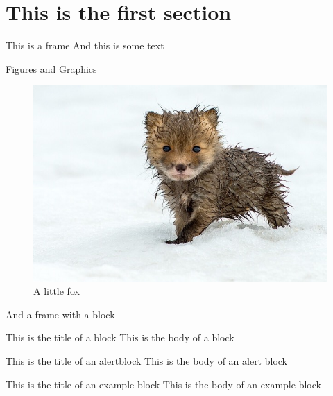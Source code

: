 \documentclass[xcolor=svgnames]{beamer}
\begin{document}
{ 

}


\section{This is the first section} 


\begin{frame}{This is a frame}
    And this is some text
\end{frame}


\begin{frame}{Figures and Graphics}
    \begin{figure}
        \centering
        \includegraphics[scale=0.3]{fox}
        \caption{A little fox}
    \end{figure}
\end{frame}


\begin{frame}{And a frame with a block}
    \begin{block}{This is the title of a block}
    This is the body of a block 
    \end{block}

    \begin{alertblock}{This is the title of an alertblock}
    This is the body of an alert block 
    \end{alertblock}

    \begin{exampleblock}{This is the title of an example block}
    This is the body of an example block 
    \end{exampleblock}

\end{frame}
\end{document}
